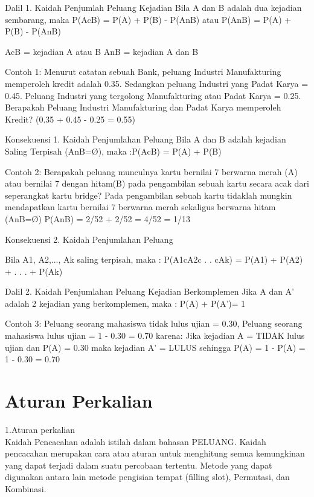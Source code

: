 \documentclass[11pt,fleqn]{book} %
\begin{document}
Dalil 1. Kaidah Penjumlah Peluang Kejadian
Bila A dan B adalah dua kejadian sembarang, maka
P(AcB) = P(A) + P(B) - P(AnB)
atau
P(AnB) = P(A) + P(B) - P(AnB)

AcB = kejadian A atau B                        AnB = kejadian A dan B

 Contoh 1:
Menurut catatan sebuah Bank, peluang Industri Manufakturing memperoleh kredit adalah
0.35. Sedangkan peluang Industri yang Padat Karya = 0.45. Peluang Industri yang
tergolong Manufakturing atau Padat Karya = 0.25. Berapakah Peluang Industri
Manufakturing dan Padat Karya memperoleh Kredit? (0.35 + 0.45 - 0.25 = 0.55)

Konsekuensi 1. Kaidah Penjumlahan Peluang
Bila A dan B adalah kejadian Saling Terpisah (AnB=Ø), maka :P(AcB) = P(A) + P(B)

Contoh 2:
Berapakah peluang munculnya kartu bernilai 7 berwarna merah (A) atau bernilai 7 dengan
hitam(B) pada pengambilan sebuah kartu secara acak dari seperangkat kartu bridge?
Pada pengambilan sebuah kartu tidaklah mungkin mendapatkan kartu bernilai 7 berwarna
merah sekaligus berwarna hitam (AnB=Ø)
P(AnB) = 2/52 + 2/52 = 4/52 = 1/13

Konsekuensi 2. Kaidah Penjumlahan Peluang

Bila A1, A2,..., Ak saling terpisah, maka :
P(A1cA2c . . cAk) = P(A1) + P(A2) + . . . + P(Ak)

Dalil 2. Kaidah Penjumlahan Peluang Kejadian Berkomplemen
Jika A dan A' adalah 2 kejadian yang berkomplemen, maka :
P(A) + P(A')= 1

Contoh 3:
Peluang seorang mahasiswa tidak lulus ujian = 0.30, Peluang seorang mahasiswa lulus
ujian = 1 - 0.30 = 0.70
karena:
Jika kejadian A = TIDAK lulus ujian dan P(A) = 0.30
maka kejadian A’ = LULUS sehingga P(A) = 1 - P(A) = 1 - 0.30 = 0.70
 



\section{Aturan Perkalian}



1.Aturan perkalian\\

	Kaidah Pencacahan adalah istilah dalam bahasan PELUANG. Kaidah pencacahan merupakan cara atau aturan untuk menghitung semua kemungkinan yang dapat terjadi dalam suatu percobaan tertentu. Metode yang dapat digunakan antara lain metode pengisian tempat (filling slot), Permutasi, dan Kombinasi.\\ 
\end{document}
